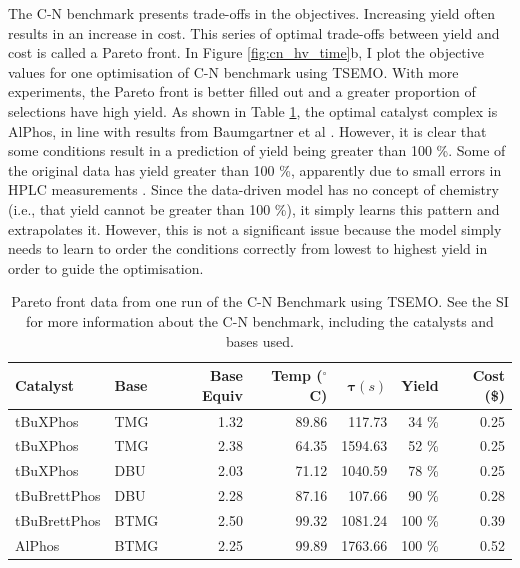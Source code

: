 The C-N benchmark presents trade-offs in the objectives. Increasing yield often results in an increase in cost. This series of optimal trade-offs between yield and cost is called a Pareto front. In Figure \ref{fig:cn_hv_time}b, I plot the objective values for one optimisation of C-N benchmark using TSEMO. With more experiments, the Pareto front is better filled out and a greater proportion of selections have high yield. As shown in Table \ref{tab:cn_benchmark_results}, the optimal catalyst complex is AlPhos, in line with results from Baumgartner et al \cite{Baumgartner2019}. However, it is clear that some conditions result in a prediction of yield being greater than 100 \%. Some of the original data has yield greater than 100 \%, apparently due to small errors in HPLC measurements \cite{Baumgartner2019}. Since the data-driven model has no concept of chemistry (i.e., that yield cannot be greater than 100 \%), it simply learns this pattern and extrapolates it. However, this is not a significant issue because the model simply needs to learn to order the conditions correctly from lowest to highest yield in order to guide the optimisation.

\begin{table}[tb]
    \centering
    \caption{Pareto front data from one run of the C-N Benchmark using TSEMO. See the SI for more information about the C-N benchmark, including the catalysts and bases used.
    }
    \begin{tabular}{llrrrrr}
    \hline
         \textbf{Catalyst} &  \textbf{Base} & \textbf{Base Equiv} & \textbf{Temp ($^{\circ}$ C)} &       $\boldsymbol{\tau}  (s)$ &     \textbf{Yield} &      \textbf{Cost (\$)} \\
    \hline
     tBuXPhos &   TMG &             1.32 &       89.86 &   117.73 &  34 \% &  0.25 \\
     tBuXPhos &   TMG &             2.38 &       64.35 &  1594.63 &  52 \% &  0.25 \\
     tBuXPhos &   DBU &             2.03 &       71.12 &  1040.59 &  78 \% &  0.25 \\
 tBuBrettPhos &   DBU &             2.28 &       87.16 &   107.66 &  90 \% &  0.28 \\
 tBuBrettPhos &  BTMG &             2.50 &       99.32 &  1081.24 &  100 \% &  0.39 \\
       AlPhos &  BTMG &             2.25 &       99.89 &  1763.66 &  100 \% &  0.52 \\
    \end{tabular}

    \label{tab:cn_benchmark_results}
\end{table}

